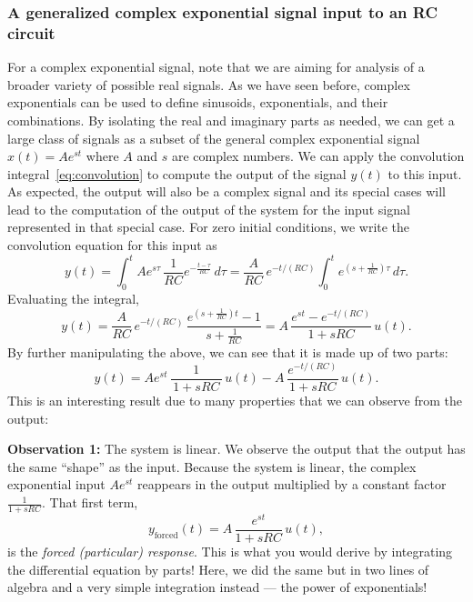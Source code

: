 \documentclass{ee102_notes}
\begin{document}
\subsubsection{A generalized complex exponential signal input to an RC circuit}
For a complex exponential signal, note that we are aiming for analysis of a broader variety of possible real signals. As we have seen before, complex exponentials can be used to define sinusoids, exponentials, and their combinations. By isolating the real and imaginary parts as needed, we can get a large class of signals as a subset of the general complex exponential signal $x(t) = A e^{st}$ where $A$ and $s$ are complex numbers. We can apply the convolution integral~\eqref{eq:convolution} to compute the output of the signal $y(t)$ to this input. As expected, the output will also be a complex signal and its special cases will lead to the computation of the output of the system for the input signal represented in that special case. 
For zero initial conditions, we write the convolution equation for this input as
\[
y(t)=\int_{0}^{t} A e^{s\tau}\,\frac{1}{RC}e^{-\frac{t-\tau}{RC}}\,d\tau
= \frac{A}{RC}\,e^{-t/(RC)} \int_{0}^{t} e^{\left(s+\frac{1}{RC}\right)\tau}\,d\tau.
\]
Evaluating the integral,
\[
y(t)= \frac{A}{RC}\,e^{-t/(RC)}\,\frac{e^{\left(s+\frac{1}{RC}\right)t}-1}{\,s+\frac{1}{RC}\,}
= A\,\frac{e^{s t}-e^{-t/(RC)}}{\,1+sRC\,}\,u(t).
\]
By further manipulating the above, we can see that it is made up of two parts:
\begin{equation}
    \label{eq:output-complex}
y(t) = Ae^{st}\,\frac{1}{\,1+sRC\,}\,u(t) - A\,\frac{e^{-t/(RC)}}{\,1+sRC\,}\,u(t).
\end{equation}
This is an interesting result due to many properties that we can observe from the output:

\textbf{Observation 1:} The system is linear. We observe the output that the output has the same ``shape'' as the input. Because the system is linear, the complex exponential input $A e^{st}$ reappears in the output multiplied by a constant factor $\frac{1}{1+sRC}$. That first term,
  \[
  y_{\text{forced}}(t)=A\,\frac{e^{st}}{1+sRC}\,u(t),
  \]
  is the \emph{forced (particular) response}. This is what you would derive by integrating the differential equation by parts! Here, we did the same but in two lines of algebra and a very simple integration instead --- the power of exponentials!
\end{document}
